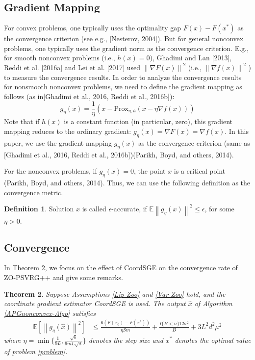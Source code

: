 \documentclass{article}
\newcommand*{\Po}{\text{Prox}}
\newcommand*{\E}{\mathbb{E}}
\newcommand{\norm}[1]{\left\lVert#1\right\rVert}
\newtheorem{theorem}{Theorem}[section]
\theoremstyle{definition}
\newtheorem{definition}[theorem]{Definition}
\theoremstyle{remark}
\begin{document}
\subsection{Gradient Mapping}
{\color{Violet}
For convex problems, one typically uses the optimality gap $F(x) - F(x^*)$ as the convergence criterion (see e.g.,
[Nesterov, 2004]). But for general nonconvex problems, one typically uses the gradient norm as the convergence
criterion. E.g., for smooth nonconvex problems (i.e., $h(x) = 0$), Ghadimi and Lan [2013], Reddi et al. [2016a]
and Lei et al. [2017] used $\norm{\nabla F(x)}^2$ (i.e., $\norm{\nabla f(x)}^2$ ) to measure the convergence results. In order to analyze the
convergence results for nonsmooth nonconvex problems, we need to define the gradient mapping as follows (as in[Ghadimi et al., 2016, Reddi et al., 2016b]):
\begin{equation}
g_{\eta}(x) = \frac{1}{\eta}(x-\Po_{\eta,h}(x-\eta \nabla f(x)))
\end{equation}
Note that if $h(x)$ is a constant function (in particular, zero), this gradient mapping reduces to the ordinary gradient:
$g_{\eta}(x) = \nabla F(x) = \nabla f(x)$. In this paper, we use the gradient mapping $g_{\eta}(x)$ as the convergence criterion (same as
[Ghadimi et al., 2016, Reddi et al., 2016b]){\color{Green}(Parikh, Boyd, and others, 2014)}.}
{\color{Green}
For the nonconvex problems, if $g_{\eta}(x) = 0$, the point $x$ is a critical point (Parikh, Boyd, and others, 2014). Thus, we can
use the following definition as the convergence metric.
\begin{definition}
Solution $x$ is called $\epsilon$-accurate, if $\E\norm{g_{\eta}(x)}^2 \leq \epsilon$, for some $\eta > 0$.
\end{definition}
}
\subsection{Convergence}
In Theorem \ref{noncon-zoo}, we focus on the effect of CoordSGE on the convergence rate of ZO-PSVRG++ and give some remarks.

\begin{theorem}\label{noncon-zoo}
Suppose Assumptions \ref{Lip-Zoo} and \ref{Var-Zoo} hold, and the coordinate gradient estimator CoordSGE is used. The output $\hat{x}$ of Algorithm \ref{APGnonconvex-Algo} satisfies
  \begin{equation}\label{noncon-zoo-main}
  \begin{split}
\E[\norm{g_{\eta}(\hat{x})}^2] & \leq \frac{6\left(F(x_0) - F({x}^*)\right)}{\eta Sm} + \frac{I\{B < n\}12\sigma ^2}{B}+3{L^2 d^2 \mu^2}
\end{split}
 \end{equation}
where $\eta = \min\{\frac{1}{8L}, \frac{\sqrt{b}}{6mL\sqrt{d}}\}$ denotes the step size and $x^*$ denotes the optimal value of problem \ref{problem}.
\end{theorem}
\end{document}
